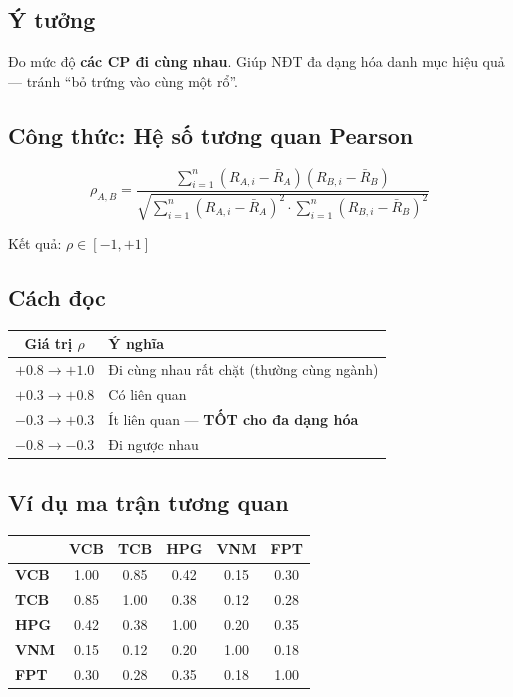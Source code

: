 \documentclass[12pt,a4paper]{article}
\begin{document}
\subsection{Ý tưởng}
Đo mức độ \textbf{các CP đi cùng nhau}. Giúp NĐT đa dạng hóa danh mục hiệu quả — tránh ``bỏ trứng vào cùng một rổ''.

\subsection{Công thức: Hệ số tương quan Pearson}

\begin{equation}
\boxed{
  \rho_{A,B} = \frac{\displaystyle\sum_{i=1}^{n}(R_{A,i} - \bar{R}_A)(R_{B,i} - \bar{R}_B)}{\sqrt{\displaystyle\sum_{i=1}^{n}(R_{A,i} - \bar{R}_A)^2 \cdot \sum_{i=1}^{n}(R_{B,i} - \bar{R}_B)^2}}
}
\end{equation}

Kết quả: $\rho \in [-1, +1]$

\subsection{Cách đọc}

\begin{tabularx}{\textwidth}{c X}
\toprule
\textbf{Giá trị $\rho$} & \textbf{Ý nghĩa} \\
\midrule
$+0.8 \to +1.0$ & Đi cùng nhau rất chặt (thường cùng ngành) \\
$+0.3 \to +0.8$ & Có liên quan \\
$-0.3 \to +0.3$ & Ít liên quan — \textbf{TỐT cho đa dạng hóa} \\
$-0.8 \to -0.3$ & Đi ngược nhau \\
\bottomrule
\end{tabularx}

\subsection{Ví dụ ma trận tương quan}

\begin{tabular}{l c c c c c}
\toprule
 & \textbf{VCB} & \textbf{TCB} & \textbf{HPG} & \textbf{VNM} & \textbf{FPT} \\
\midrule
\textbf{VCB} & 1.00 & \textcolor{red-neg}{0.85} & 0.42 & 0.15 & 0.30 \\
\textbf{TCB} & \textcolor{red-neg}{0.85} & 1.00 & 0.38 & 0.12 & 0.28 \\
\textbf{HPG} & 0.42 & 0.38 & 1.00 & 0.20 & 0.35 \\
\textbf{VNM} & 0.15 & 0.12 & 0.20 & 1.00 & \textcolor{green-pos}{0.18} \\
\textbf{FPT} & 0.30 & 0.28 & 0.35 & \textcolor{green-pos}{0.18} & 1.00 \\
\bottomrule
\end{tabular}
\end{document}
